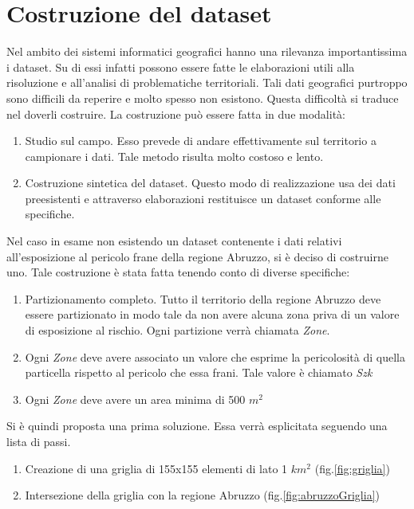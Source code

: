 
\chapter{Costruzione del dataset}
Nel ambito dei sistemi informatici geografici hanno una rilevanza importantissima i dataset. Su di essi infatti possono essere fatte le elaborazioni utili alla risoluzione e all'analisi di problematiche territoriali. Tali dati geografici purtroppo sono difficili da reperire e molto spesso non esistono. Questa difficoltà si traduce nel doverli costruire. La costruzione può essere fatta in due modalità:
\begin{enumerate}
	\item Studio sul campo. Esso prevede di andare effettivamente sul territorio a campionare i dati. Tale metodo risulta molto costoso e lento.
	\item Costruzione sintetica del dataset. Questo modo di realizzazione usa dei dati preesistenti e attraverso elaborazioni restituisce un dataset conforme alle specifiche.
\end{enumerate}
Nel caso in esame non esistendo un dataset contenente i dati relativi all'esposizione al pericolo frane della regione Abruzzo, si è deciso di costruirne uno. Tale costruzione è stata fatta tenendo conto di diverse specifiche:
\begin{enumerate}
	\item Partizionamento completo. Tutto il territorio della regione Abruzzo deve essere partizionato in modo tale da non avere alcuna zona priva di un valore di esposizione al rischio. Ogni partizione verrà chiamata \textit{Zone}.
	\item Ogni \textit{Zone} deve avere associato un valore che esprime la pericolosità di quella particella rispetto al pericolo che essa frani. Tale valore è chiamato \textit{Szk}
	\item Ogni \textit{Zone} deve avere un area minima di 500 $m^2$
\end{enumerate}
Si è quindi proposta una prima soluzione. Essa verrà esplicitata seguendo una lista di passi.
\begin{enumerate}
	\item Creazione di una griglia di 155x155 elementi di lato 1 $km^2$ (fig.\ref{fig:griglia})
	\item Intersezione della griglia con la regione Abruzzo (fig.\ref{fig:abruzzoGriglia})
\end{enumerate}

